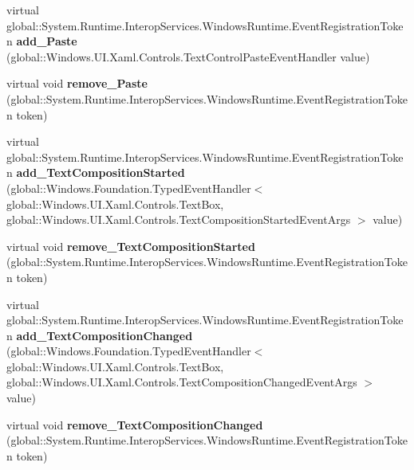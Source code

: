 \begin{DoxyCompactItemize}
virtual global\+::\+System.\+Runtime.\+Interop\+Services.\+Windows\+Runtime.\+Event\+Registration\+Token {\bfseries add\+\_\+\+Paste} (global\+::\+Windows.\+U\+I.\+Xaml.\+Controls.\+Text\+Control\+Paste\+Event\+Handler value)
\item 
\mbox{\label{class_windows_1_1_u_i_1_1_xaml_1_1_controls_1_1_text_box_affd66f6fbd07759509d7f75dab0e7186}} 
virtual void {\bfseries remove\+\_\+\+Paste} (global\+::\+System.\+Runtime.\+Interop\+Services.\+Windows\+Runtime.\+Event\+Registration\+Token token)
\item 
\mbox{\label{class_windows_1_1_u_i_1_1_xaml_1_1_controls_1_1_text_box_a7ee5e64932c7b9974d38444e13822e2c}} 
virtual global\+::\+System.\+Runtime.\+Interop\+Services.\+Windows\+Runtime.\+Event\+Registration\+Token {\bfseries add\+\_\+\+Text\+Composition\+Started} (global\+::\+Windows.\+Foundation.\+Typed\+Event\+Handler$<$ global\+::\+Windows.\+U\+I.\+Xaml.\+Controls.\+Text\+Box, global\+::\+Windows.\+U\+I.\+Xaml.\+Controls.\+Text\+Composition\+Started\+Event\+Args $>$ value)
\item 
\mbox{\label{class_windows_1_1_u_i_1_1_xaml_1_1_controls_1_1_text_box_ad3e96b82e37de938e7295300b6dc9c44}} 
virtual void {\bfseries remove\+\_\+\+Text\+Composition\+Started} (global\+::\+System.\+Runtime.\+Interop\+Services.\+Windows\+Runtime.\+Event\+Registration\+Token token)
\item 
\mbox{\label{class_windows_1_1_u_i_1_1_xaml_1_1_controls_1_1_text_box_a4ea12e73d910d27530312ae26996c11a}} 
virtual global\+::\+System.\+Runtime.\+Interop\+Services.\+Windows\+Runtime.\+Event\+Registration\+Token {\bfseries add\+\_\+\+Text\+Composition\+Changed} (global\+::\+Windows.\+Foundation.\+Typed\+Event\+Handler$<$ global\+::\+Windows.\+U\+I.\+Xaml.\+Controls.\+Text\+Box, global\+::\+Windows.\+U\+I.\+Xaml.\+Controls.\+Text\+Composition\+Changed\+Event\+Args $>$ value)
\item 
\mbox{\label{class_windows_1_1_u_i_1_1_xaml_1_1_controls_1_1_text_box_ae941b45f52cc8e88d708275c4313ef9a}} 
virtual void {\bfseries remove\+\_\+\+Text\+Composition\+Changed} (global\+::\+System.\+Runtime.\+Interop\+Services.\+Windows\+Runtime.\+Event\+Registration\+Token token)

\end{DoxyCompactItemize}
